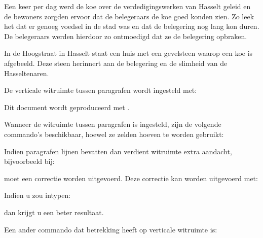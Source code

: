 Een keer per dag werd de koe over de verdedigingswerken van
Hasselt geleid en de bewoners zorgden ervoor dat de
belegeraars de koe goed konden zien. Zo leek het dat er
genoeg voedsel in de stad was en dat de belegering nog lang
kon duren. De belegeraars werden hierdoor zo ontmoedigd dat
ze de belegering opbraken.

In de Hoogstraat in Hasselt staat een huis met een gevelsteen
waarop een koe is afgebeeld. Deze steen herinnert aan de
belegering en de slimheid van de Hasseltenaren.
\stopbuffer

\typebuffer




De verticale witruimte tussen paragrafen
wordt ingesteld met:


Dit document wordt geproduceerd met
\type{\stelwitruimtein[middel]}.

Wanneer de witruimte tussen paragrafen is ingesteld, zijn de
volgende commando's beschikbaar, hoewel ze zelden hoeven te
worden gebruikt:

\starttypen
\geenwitruimte
\witruimte
\stoptypen

Indien paragrafen lijnen bevatten dan verdient witruimte
extra aandacht, bijvoorbeeld bij:

\startbuffer
{}
\stopbuffer

\haalbuffer

moet een correctie worden uitgevoerd. Deze correctie kan
worden uitgevoerd met:


Indien u zou intypen:

\startbuffer
\startregelcorrectie
{}
\stopregelcorrectie
\stopbuffer

\typebuffer

dan krijgt u een beter resultaat.

\haalbuffer

Een ander commando dat betrekking heeft op verticale
witruimte is:

